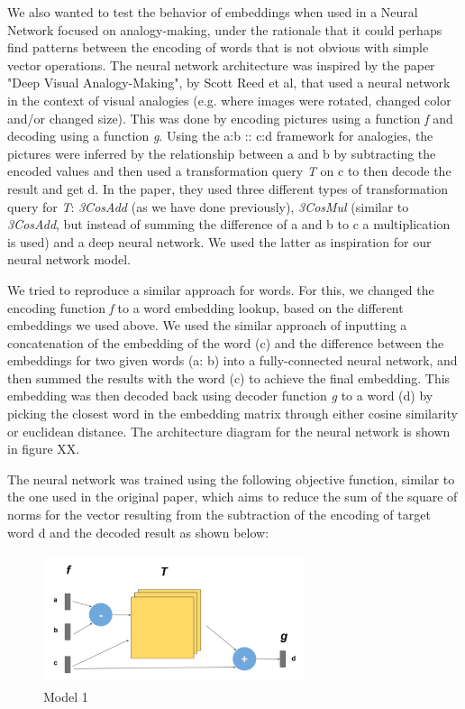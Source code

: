 \documentclass[11pt]{article}
\begin{document}
We also wanted to test the behavior of embeddings when used in a Neural
Network focused on analogy-making, under the rationale that it could
perhaps find patterns between the encoding of words that is not obvious
with simple vector operations. The neural network architecture was
inspired by the paper "Deep Visual Analogy-Making", by Scott Reed et al,
that used a neural network in the context of visual analogies (e.g.
where images were rotated, changed color and/or changed size). This was
done by encoding pictures using a function \emph{f} and decoding using a
function \emph{g}. Using the a:b :: c:d framework for analogies, the
pictures were inferred by the relationship between a and b by
subtracting the encoded values and then used a transformation query
\emph{T} on c to then decode the result and get d. In the paper, they
used three different types of transformation query for \emph{T}:
\emph{3CosAdd} (as we have done previously), \emph{3CosMul} (similar to
\emph{3CosAdd}, but instead of summing the difference of a and b to c a
multiplication is used) and a deep neural network. We used the latter as
inspiration for our neural network model.

We tried to reproduce a similar approach for words. For this, we changed
the encoding function \emph{f} to a word embedding lookup, based on the
different embeddings we used above. We used the similar approach of
inputting a concatenation of the embedding of the word (c) and the
difference between the embeddings for two given words (a: b) into a
fully-connected neural network, and then summed the results with the
word (c) to achieve the final embedding. This embedding was then decoded
back using decoder function \emph{g }to a word (d) by picking the
closest word in the embedding matrix through either cosine similarity or
euclidean distance. The architecture diagram for the neural network is
shown in figure XX.

The neural network was trained using the following objective function,
similar to the one used in the original paper, which aims to reduce the
sum of the square of norms for the vector resulting from the subtraction
of the encoding of target word d and the decoded result as shown below:

\begin{figure}
  \centering
\includegraphics[width=3.0in,height=1.5in]{./model_1.png}
  \caption{Model 1}
\end{figure}
\end{document}
